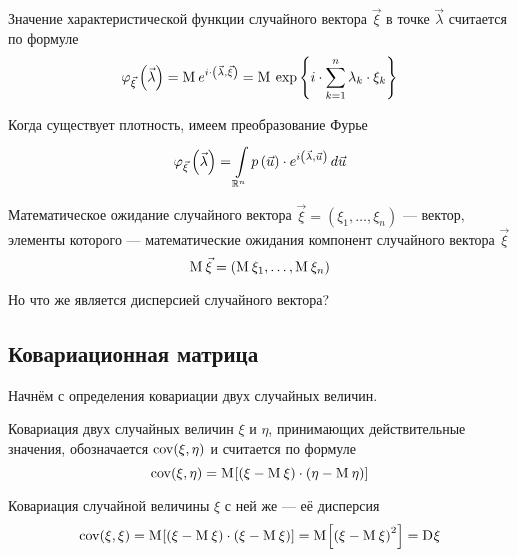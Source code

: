 \begin{definition}
    Значение характеристической функции случайного вектора $\vec{\xi}$
    в точке $\vec{\lambda}$ считается по формуле
    $$\varphi_{\vec{\xi}}\left( \vec{\lambda} \right)
        = \mean{e^{i \cdot \left( \vec{\lambda}, \vec{\xi} \right)}}
        = \mean{
            \exp{\left\{ i \cdot \sum_{k=1}^n \lambda_k \cdot \xi_k \right\}}}$$

    Когда существует плотность, имеем преобразование Фурье
    $$\varphi_{\vec{\xi}}\left( \vec{\lambda} \right)
        = \integrall{\mathbb{R}^n}{d\vec{u}}{\pdf{\vec{u}} \cdot
            e^{i \left( \vec{\lambda}, \vec{u} \right)}}$$
\end{definition}

\begin{definition}
    Математическое ожидание случайного вектора
    $\vec{\xi} = \left( \xi_1, \dots, \xi_n \right)$ --- вектор,
    элементы которого --- математические ожидания компонент
    случайного вектора $\vec{\xi}$
    $$\mean{\vec{\xi}} = \left( \mean{\xi_1}, \dots, \mean{\xi_n} \right)$$
\end{definition}

Но что же является дисперсией случайного вектора?

\subsection{Ковариационная матрица}

Начнём с определения ковариации двух случайных величин.

\begin{definition}[Ковариация]
    Ковариация двух случайных величин $\xi$ и $\eta$, принимающих действительные
    значения, обозначается $\cov{\xi, \eta}$ и считается по формуле
    $$\cov{\xi, \eta}
        = \Mean{\left( \xi - \mean{\xi} \right)
            \cdot \left( \eta - \mean{\eta} \right)}$$
\end{definition}

\begin{remark}
    Ковариация случайной величины $\xi$ с ней же --- её дисперсия
    $$\cov{\xi, \xi}
        = \Mean{\left( \xi - \mean{\xi} \right)
            \cdot \left( \xi - \mean{\xi} \right)}
        = \Mean{\left( \xi - \mean{\xi} \right)^2}
        = \dispersion{\xi}$$
\end{remark}


